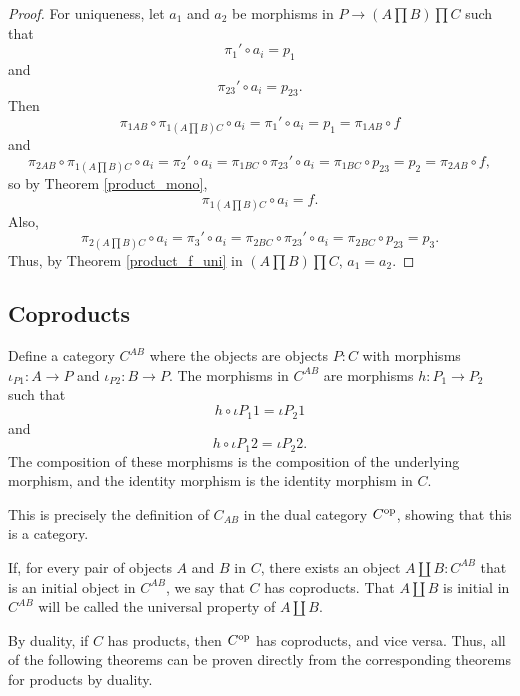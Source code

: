 \documentclass[../math.tex]{subfiles}
\begin{document}
\begin{proof}
    For uniqueness, let $a_1$ and $a_2$ be morphisms in $P \to (A \prod B) \prod
    C$ such that
    \[
        \pi_1' \circ a_i = p_1
    \]
    and
    \[
        \pi_{23}' \circ a_i = p_{23}.
    \]
    Then
    \[
        \pi_{1AB} \circ \pi_{1 (A \prod B) C} \circ a_i
        = \pi_1' \circ a_i
        = p_1
        = \pi_{1AB} \circ f
    \]
    and
    \[
        \pi_{2AB} \circ \pi_{1 (A \prod B) C} \circ a_i
        = \pi_2' \circ a_i
        = \pi_{1BC} \circ \pi_{23}' \circ a_i
        = \pi_{1BC} \circ p_{23}
        = p_2
        = \pi_{2AB} \circ f,
    \]
    so by Theorem \ref{product_mono},
    \[
        \pi_{1 (A \prod B) C} \circ a_i = f.
    \]
    Also,
    \[
        \pi_{2 (A \prod B) C} \circ a_i
        = \pi_3' \circ a_i
        = \pi_{2BC} \circ \pi_{23}' \circ a_i
        = \pi_{2BC} \circ p_{23}
        = p_3.
    \]
    Thus, by Theorem \ref{product_f_uni} in $(A \prod B) \prod C$, $a_1 = a_2$.
\end{proof}

\subsection{Coproducts}

\begin{definition}
    Define a category $C^{AB}$ where the objects are objects $P : C$ with
    morphisms $\iota_{P1} : A \to P$ and $\iota_{P2} : B \to P$.  The morphisms
    in $C^{AB}$ are morphisms $h : P_1 \to P_2$ such that
    \[
        h \circ \iota{P_1 1} = \iota{P_2 1}
    \]
    and
    \[
        h \circ \iota{P_1 2} = \iota{P_2 2}.
    \]
    The composition of these morphisms is the composition of the underlying
    morphism, and the identity morphism is the identity morphism in $C$.
\end{definition}

This is precisely the definition of $C_{AB}$ in the dual category $C^{\mathrm{op}}$,
showing that this is a category.

\begin{class}
    If, for every pair of objects $A$ and $B$ in $C$, there exists an object $A
    \amalg B : C^{AB}$ that is an initial object in $C^{AB}$, we say that $C$
    has coproducts.  That $A \amalg B$ is initial in $C^{AB}$ will be called the
    universal property of $A \amalg B$.
\end{class}

By duality, if $C$ has products, then $C^{\mathrm{op}}$ has coproducts, and vice versa.
Thus, all of the following theorems can be proven directly from the
corresponding theorems for products by duality.
\end{document}
